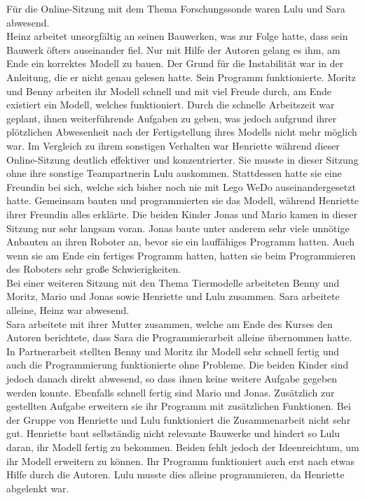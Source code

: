 Für die Online-Sitzung mit dem Thema Forschungssonde waren Lulu und Sara abwesend.\\
Heinz arbeitet unsorgfältig an seinen Bauwerken, was zur Folge hatte, dass sein Bauwerk öfters auseinander fiel. Nur mit Hilfe der Autoren gelang es ihm, am Ende ein korrektes Modell zu bauen. Der Grund für die Instabilität war in der Anleitung, die er nicht genau gelesen hatte. Sein Programm funktionierte. Moritz und Benny arbeiten ihr Modell schnell und mit viel Freude durch, am Ende existiert ein Modell, welches funktioniert. Durch die schnelle Arbeitszeit war geplant, ihnen weiterführende Aufgaben zu geben, was jedoch aufgrund ihrer plötzlichen Abwesenheit nach der Fertigstellung ihres Modells nicht mehr möglich war. Im Vergleich zu ihrem sonstigen Verhalten war Henriette während dieser Online-Sitzung deutlich effektiver und konzentrierter. Sie musste in dieser Sitzung ohne ihre sonstige Teampartnerin Lulu auskommen. Stattdessen hatte sie eine Freundin bei sich, welche sich bisher noch nie mit Lego WeDo auseinandergesetzt hatte. Gemeinsam bauten und programmierten sie das Modell, während Henriette ihrer Freundin alles erklärte. Die beiden Kinder Jonas und Mario kamen in dieser Sitzung nur sehr langsam voran. Jonas baute unter anderem sehr viele unnötige Anbauten an ihren Roboter an, bevor sie ein lauffähiges Programm hatten. Auch wenn sie am Ende ein fertiges Programm hatten, hatten sie beim Programmieren des Roboters sehr große Schwierigkeiten.\\
Bei einer weiteren Sitzung mit den Thema Tiermodelle arbeiteten Benny und Moritz, Mario und Jonas sowie Henriette und Lulu zusammen. Sara arbeitete alleine, Heinz war abwesend.\\
Sara arbeitete mit ihrer Mutter zusammen, welche am Ende des Kurses den Autoren berichtete, dass Sara die Programmierarbeit alleine übernommen hatte. In Partnerarbeit stellten Benny und Moritz ihr Modell sehr schnell fertig und auch die Programmierung funktionierte ohne Probleme. Die beiden Kinder sind jedoch danach direkt abwesend, so dass ihnen keine weitere Aufgabe gegeben werden konnte. Ebenfalls schnell fertig sind Mario und Jonas. Zusätzlich zur gestellten Aufgabe erweitern sie ihr Programm mit zusätzlichen Funktionen. Bei der Gruppe von Henriette und Lulu funktioniert die Zusammenarbeit nicht sehr gut. Henriette baut selbständig nicht relevante Bauwerke und hindert so Lulu daran, ihr Modell fertig zu bekommen. Beiden fehlt jedoch der Ideenreichtum, um ihr Modell erweitern zu können. Ihr Programm funktioniert auch erst nach etwas Hilfe durch die Autoren. Lulu musste dies alleine programmieren, da Henriette abgelenkt war.\\
